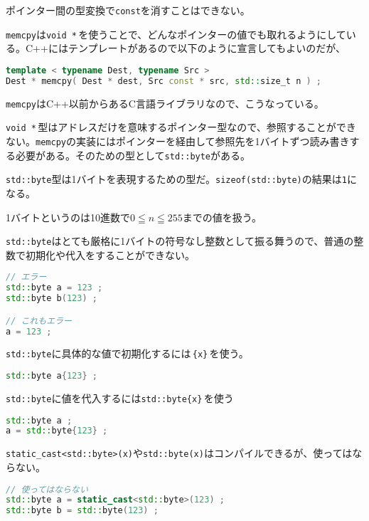 ポインター間の型変換で\texttt{const}を消すことはできない。

\texttt{memcpy}は\texttt{void *}\,を使うことで、どんなポインターの値でも取れるようにしている。C++にはテンプレートがあるので以下のように宣言してもよいのだが、
\begin{lstlisting}[language={C++}]
template < typename Dest, typename Src >
Dest * memcpy( Dest * dest, Src const * src, std::size_t n ) ;
\end{lstlisting}
\texttt{memcpy}はC++以前からあるC言語ライブラリなので、こうなっている。


\texttt{void *}\,型はアドレスだけを意味するポインター型なので、参照することができない。\texttt{memcpy}の実装にはポインターを経由して参照先を1バイトずつ読み書きする必要がある。そのための型として\texttt{std::byte}がある。

\texttt{std::byte}型は1バイトを表現するための型だ。\texttt{sizeof(std::byte)}の結果は\texttt{1}になる。

1バイトというのは10進数で\(0 \leqq n \leqq 255\)までの値を扱う。

\texttt{std::byte}はとても厳格に1バイトの符号なし整数として振る舞うので、普通の整数で初期化や代入をすることができない。

\begin{lstlisting}[language={C++}]
// エラー
std::byte a = 123 ;
std::byte b(123) ;

// これもエラー
a = 123 ;
\end{lstlisting}

\texttt{std::byte}に具体的な値で初期化するには\,\texttt{\{x\}}\,を使う。

\begin{lstlisting}[language={C++}]
std::byte a{123} ;
\end{lstlisting}

\texttt{std::byte}に値を代入するには\texttt{std::byte\{x\}}\,を使う

\begin{lstlisting}[language={C++}]
std::byte a ;
a = std::byte{123} ;
\end{lstlisting}

\texttt{static\_cast<std::byte>(x)}や\texttt{std::byte(x)}はコンパイルできるが、使ってはならない。

\begin{lstlisting}[language={C++}]
// 使ってはならない
std::byte a = static_cast<std::byte>(123) ;
std::byte b = std::byte(123) ;
\end{lstlisting}


